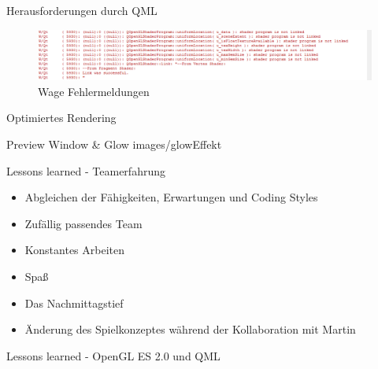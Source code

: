 \begin{frame}{Herausforderungen durch QML}
	\begin{figure}
		\centering
	\end{figure}
	\begin{figure}
		\centering
		\includegraphics[width=\textwidth, height=0.2\textheight, keepaspectratio]{images/linkerrorsuccess}
		\caption{Wage Fehlermeldungen}
	\end{figure}
\end{frame}

\begin{frame}{Optimiertes Rendering}

\end{frame}

\slidegraphic
{Preview Window \& Glow}
{images/glowEffekt}
{}

\begin{frame}{Lessons learned - Teamerfahrung}
	\begin{itemize}
		\item Abgleichen der Fähigkeiten, Erwartungen und Coding Styles
		\item Zufällig passendes Team
		\item Konstantes Arbeiten
		\item Spaß
	\end{itemize}
	\vfill
	\begin{itemize}
		\item Das Nachmittagstief
		\item Änderung des Spielkonzeptes während der Kollaboration mit Martin
	\end{itemize}
\end{frame}

\begin{frame}{Lessons learned - OpenGL ES 2.0 und QML}

\end{frame}

%

